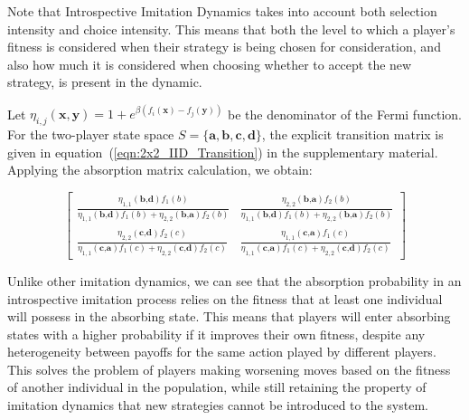 \documentclass{article}
\begin{document}
Note that Introspective Imitation Dynamics takes into
account both selection intensity and choice intensity. This means that both the
level to which a player's fitness is considered when their strategy is being chosen for
consideration, and also how much it is considered when choosing whether to
accept the new strategy, is present in the dynamic.

Let \(\eta_{i,j}(\mathbf{x}, \mathbf{y}) = 1 + e^{\beta(f_i(\mathbf{x}) - f_j(\mathbf{y}))}\)
be the denominator of the Fermi function. For the two-player state space
\(S = \{\mathbf{a},\mathbf{b},\mathbf{c},\mathbf{d}\}\), the explicit
transition matrix is given in equation~(\ref{eqn:2x2_IID_Transition}) in the
supplementary material. Applying the absorption matrix calculation, we obtain:

\begin{center}
\begin{large}
\begin{equation}
\begin{bmatrix}
\frac{\eta_{1,1}(\textbf{b,d})f_{1}{\left(b \right)}}{\eta_{1,1}(\textbf{b,d}) f_{1}{\left(b \right)} + \eta_{2,2}(\textbf{b,a}) f_{2}{\left(b \right)}} & \frac{\eta_{2,2}(\textbf{b,a}) f_{2}{\left(b \right)}}{\eta_{1,1}(\textbf{b,d}) f_{1}{\left(b \right)} + \eta_{2,2}(\textbf{b,a}) f_{2}{\left(b \right)}}\\\frac{\eta_{2,2}(\textbf{c,d}) f_{2}{\left(c \right)}}{\eta_{1,1}(\textbf{c,a}) f_{1}{\left(c \right)} + \eta_{2,2}(\textbf{c,d}) f_{2}{\left(c \right)}} & \frac{\eta_{1,1}(\textbf{c,a}) f_{1}{\left(c \right)}}{\eta_{1,1}(\textbf{c,a}) f_{1}{\left(c \right)} + \eta_{2,2}(\textbf{c,d}) f_{2}{\left(c \right)}}
\end{bmatrix}
\end{equation}
\end{large}
\end{center}

Unlike other imitation dynamics, we can see that the absorption probability in an introspective imitation process relies on the fitness that at least one individual will possess in the absorbing state.
This means that players will enter absorbing states with a higher probability if it improves their own fitness, despite any heterogeneity between payoffs for the same action played by different players.
This solves the problem of players making worsening moves based on the fitness of another individual in the population, while still retaining the property of imitation dynamics that new strategies cannot be introduced to the system.
\end{document}

